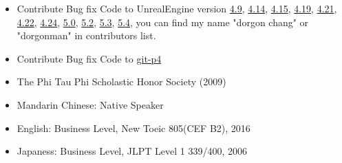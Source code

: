 \documentclass[a4paper,12pt]{memoir} %
\begin{document}
{\begin{itemize}
    \item Contribute Bug fix Code to UnrealEngine version 
    \href{https://www.unrealengine.com/en-US/blog/unreal-engine-49-released}{4.9}, 
    \href{https://www.unrealengine.com/en-US/blog/unreal-engine-4-14-released}{4.14}, 
    \href{https://www.unrealengine.com/en-US/blog/unreal-engine-4-15-released}{4.15},  
    \href{https://www.unrealengine.com/en-US/blog/unreal-engine-4-19-released}{4.19}, 
    \href{https://www.unrealengine.com/en-US/blog/unreal-engine-4-21-released}{4.21}, 
    \href{https://www.unrealengine.com/en-US/blog/unreal-engine-4-22-released}{4.22}, 
    \href{https://docs.unrealengine.com/latest/INT/Support/Builds/ReleaseNotes/4_24/}{4.24}, 
    \href{https://docs.unrealengine.com/5.0/en-US/unreal-engine-5-0-release-notes/}{5.0},
    \href{https://docs.unrealengine.com/5.2/en-US/unreal-engine-5.2-release-notes/}{5.2},
    \href{https://docs.unrealengine.com/5.3/en-US/unreal-engine-5.3-release-notes/}{5.3},
    \href{https://docs.unrealengine.com/5.4/en-US/unreal-engine-5.4-release-notes/}{5.4}, you can find my name "dorgon chang" or "dorgonman" in contributors list. \\


    \item Contribute Bug fix Code to 
    \href{https://github.com/git/git/pull/977}{git-p4} 

  \end{itemize}

}

\Sep %
\Sep %
\Sep %



\begin{itemize}
  \item The Phi Tau Phi Scholastic Honor Society (2009)
\end{itemize}


\Sep %
\Sep %
\Sep %

\begin{itemize}
  \item Mandarin Chinese: Native Speaker
  \item English: Business Level, New Toeic 805(CEF B2), 2016
  \item Japaness: Business Level, JLPT Level 1 339/400, 2006
\end{itemize}


\Sep %
\Sep %
\Sep %
\end{document}
